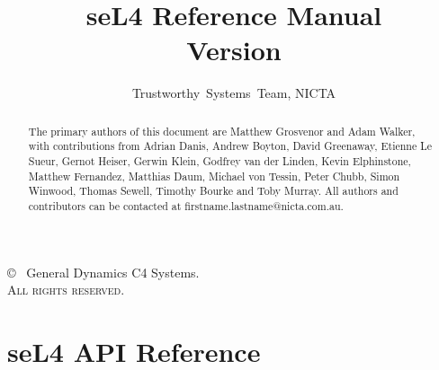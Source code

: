 \documentclass[a4paper,11pt,twoside]{report}
\date{}
\date{}
\newcommand{\version}{}
\begin{document}
  \title{seL4 Reference Manual\\Version \version}

  \author{Trustworthy~Systems~Team, NICTA}
  \date{\commitdate}

  \maketitle

  \thispagestyle{empty}

  \vfill

  \copyright~{\commityear} General Dynamics C4 Systems.\\

  \textsc{All rights reserved}.

  \thispagestyle{empty}
  \vfill
  \renewcommand{\abstractname}{Acknowledgements}
  \begin{abstract}
The primary authors of this document are Matthew Grosvenor and Adam Walker,
with contributions from Adrian Danis, Andrew Boyton, David Greenaway, Etienne
Le Sueur, Gernot Heiser, Gerwin Klein, Godfrey van der Linden, Kevin
Elphinstone, Matthew Fernandez, Matthias Daum, Michael von Tessin, Peter Chubb,
Simon Winwood, Thomas Sewell, Timothy Bourke and Toby Murray. All authors 
and contributors can be contacted at firstname.lastname@nicta.com.au.
  \end{abstract}
  \thispagestyle{empty}

  \cleardoublepage
  \setcounter{page}{1}
  \tableofcontents
  \listoftables
  \listoffigures

  \cleardoublepage
  \setcounter{page}{1}

  

  
  
  
  
  
  
  
  

  \chapter{seL4 API Reference}
  \label{sec:api_reference}
  

  \cleardoublepage
  
  
\end{document}
